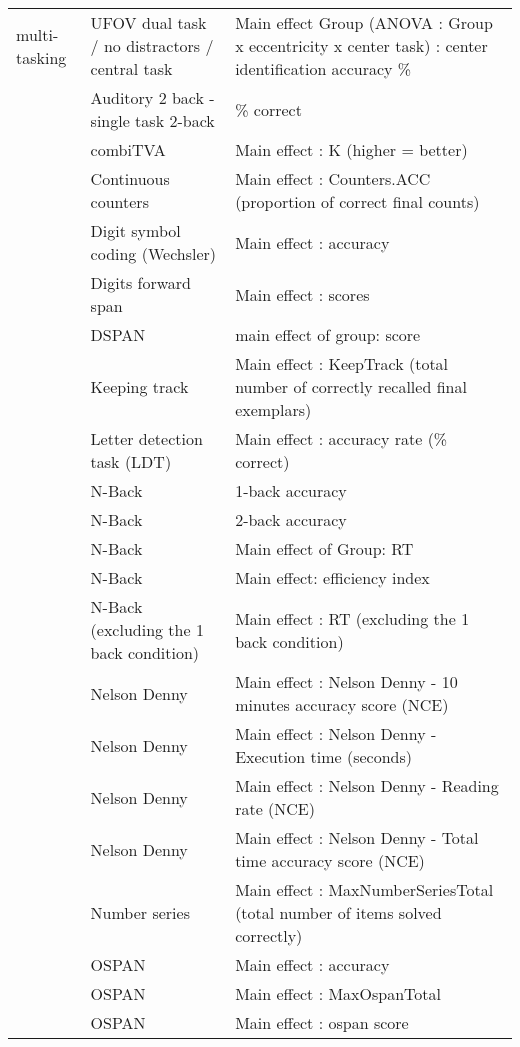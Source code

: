 \documentclass[
]{book}
\begin{document}
\begin{tabular}{l|l|l}
\cline{2-3}
\multirow[t]{-23}{*}{\raggedright\arraybackslash multi-tasking} & UFOV dual task  / no distractors / central task & Main effect Group (ANOVA : Group x eccentricity x center task) : center identification accuracy \%\\
\cline{1-3}
 & Auditory 2 back - single task 2-back & \% correct\\
\cline{2-3}
 & combiTVA & Main effect : K (higher = better)\\
\cline{2-3}
 & Continuous counters & Main effect : Counters.ACC (proportion of correct final counts)\\
\cline{2-3}
 & Digit symbol coding (Wechsler) & Main effect : accuracy\\
\cline{2-3}
 & Digits forward span & Main effect : scores\\
\cline{2-3}
 & DSPAN & main effect of group: score\\
\cline{2-3}
 & Keeping track & Main effect : KeepTrack (total number of correctly recalled final exemplars)\\
\cline{2-3}
 & Letter detection task (LDT) & Main effect : accuracy rate (\% correct)\\
\cline{2-3}
 & N-Back & 1-back accuracy\\
\cline{2-3}
 & N-Back & 2-back accuracy\\
\cline{2-3}
 & N-Back & Main effect of Group: RT\\
\cline{2-3}
 & N-Back & Main effect: efficiency index\\
\cline{2-3}
 & N-Back (excluding the 1 back condition) & Main effect : RT (excluding the 1 back condition)\\
\cline{2-3}
 & Nelson Denny & Main effect : Nelson Denny - 10 minutes accuracy score (NCE)\\
\cline{2-3}
 & Nelson Denny & Main effect : Nelson Denny - Execution time (seconds)\\
\cline{2-3}
 & Nelson Denny & Main effect : Nelson Denny - Reading rate (NCE)\\
\cline{2-3}
 & Nelson Denny & Main effect : Nelson Denny - Total time accuracy score (NCE)\\
\cline{2-3}
 & Number series & Main effect : MaxNumberSeriesTotal (total number of items solved correctly)\\
\cline{2-3}
 & OSPAN & Main effect : accuracy\\
\cline{2-3}
 & OSPAN & Main effect : MaxOspanTotal\\
\cline{2-3}
 & OSPAN & Main effect : ospan score\\

\end{tabular}
\end{document}
